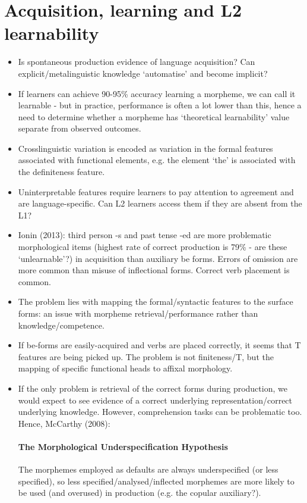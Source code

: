 \documentclass{article}
\begin{document}
\section{Acquisition, learning and L2 learnability}
\begin{itemize}
    \item Is spontaneous production evidence of language acquisition? Can explicit/metalinguistic knowledge `automatise' and become implicit?
    \item If learners can achieve 90-95\% accuracy learning a morpheme, we can call it learnable - but in practice, performance is often a lot lower than this, hence a need to determine whether a morpheme has `theoretical learnability' value separate from observed outcomes.
    \item Crosslinguistic variation is encoded as variation in the formal features associated with functional elements, e.g. the element `the' is associated with the definiteness feature.
    \item Uninterpretable features require learners to pay attention to agreement and are language-specific. Can L2 learners access them if they are absent from the L1?
    \item Ionin (2013): third person -s and past tense -ed are more problematic morphological items (highest rate of correct production is 79\% - are these `unlearnable'?) in acquisition than auxiliary be forms. Errors of omission are more common than misuse of inflectional forms. Correct verb placement is common.
    \item The problem lies with mapping the formal/syntactic features to the surface forms: an issue with morpheme retrieval/performance rather than knowledge/competence.
    \item If be-forms are easily-acquired and verbs are placed correctly, it seems that T features are being picked up. The problem is not finiteness/T, but the mapping of specific functional heads to affixal morphology.
    \item If the only problem is retrieval of the correct forms during production, we would expect to see evidence of a correct underlying representation/correct underlying knowledge. However, comprehension tasks can be problematic too. Hence, McCarthy (2008):
    \paragraph{The Morphological Underspecification Hypothesis} The morphemes employed as defaults are always underspecified
    (or less specified), so less specified/analysed/inflected morphemes are more likely to be used (and overused) in production (e.g. the copular auxiliary?).

\end{itemize}
\end{document}
